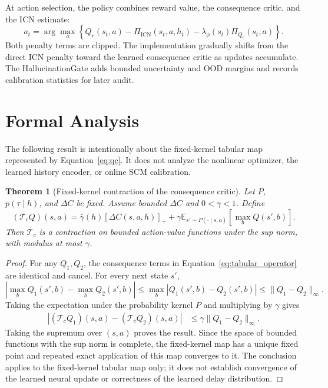 \documentclass[10pt]{article}
\newcommand{\E}{\mathbb{E}}
\newtheorem{theorem}{Theorem}
\begin{document}
At action selection, the policy combines reward value, the consequence critic,
and the ICN estimate:
\begin{equation}
a_t=\arg\max_a\left\{
Q_r(s_t,a)-\Pi_{\mathrm{ICN}}(s_t,a,h_t)-
\lambda_\phi(s_t)\Pi_{Q_c}(s_t,a)\right\}.
\end{equation}
Both penalty terms are clipped. The implementation gradually shifts from the
direct ICN penalty toward the learned consequence critic as updates accumulate.
The HallucinationGate adds bounded uncertainty and OOD margins and records
calibration statistics for later audit.

\section{Formal Analysis}
The following result is intentionally about the fixed-kernel tabular map
represented by Equation~\eqref{eq:qc}. It does not analyze the nonlinear
optimizer, the learned history encoder, or online SCM calibration.

\begin{theorem}[Fixed-kernel contraction of the consequence critic]
Let $P$, $p(\tau\mid h)$, and $\Delta C$ be fixed. Assume bounded
$\Delta C$ and $0<\gamma<1$. Define
\begin{equation}
(\mathcal{T}_cQ)(s,a)=\bar\gamma(h)[\Delta C(s,a,h)]_+
 +\gamma\E_{s'\sim P(\cdot\mid s,a)}[\max_b Q(s',b)].
\label{eq:tabular_operator}
\end{equation}
Then $\mathcal{T}_c$ is a contraction on bounded action-value functions under
the sup norm, with modulus at most $\gamma$.
\end{theorem}

\begin{proof}
For any $Q_1,Q_2$, the consequence terms in
Equation~\eqref{eq:tabular_operator} are identical and cancel. For every
next state $s'$,
\begin{equation}
\left|\max_bQ_1(s',b)-\max_bQ_2(s',b)\right|
\le \max_b|Q_1(s',b)-Q_2(s',b)|
\le \|Q_1-Q_2\|_\infty.
\end{equation}
Taking the expectation under the probability kernel $P$ and multiplying by
$\gamma$ gives
\begin{align}
\left|(\mathcal{T}_cQ_1)(s,a)-(\mathcal{T}_cQ_2)(s,a)\right|
&\le \gamma\|Q_1-Q_2\|_\infty.
\end{align}
Taking the supremum over $(s,a)$ proves the result. Since the space of
bounded functions with the sup norm is complete, the fixed-kernel map has a
unique fixed point and repeated exact application of this map converges to it.
The conclusion applies to the fixed-kernel tabular map only; it does not
establish convergence of the learned neural update or correctness of the
learned delay distribution.
\end{proof}
\end{document}
